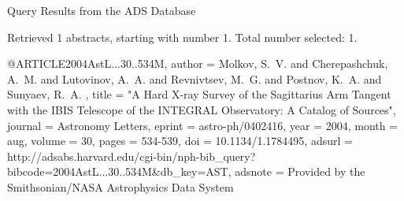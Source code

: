 Query Results from the ADS Database


Retrieved 1 abstracts, starting with number 1.  Total number selected: 1.

@ARTICLE{2004AstL...30..534M,
   author = {{Molkov}, S.~V. and {Cherepashchuk}, A.~M. and {Lutovinov}, A.~A. and 
	{Revnivtsev}, M.~G. and {Postnov}, K.~A. and {Sunyaev}, R.~A.
	},
    title = "{A Hard X-ray Survey of the Sagittarius Arm Tangent with the IBIS Telescope of the INTEGRAL Observatory: A Catalog of Sources}",
  journal = {Astronomy Letters},
   eprint = {astro-ph/0402416},
     year = 2004,
    month = aug,
   volume = 30,
    pages = {534-539},
      doi = {10.1134/1.1784495},
   adsurl = {http://adsabs.harvard.edu/cgi-bin/nph-bib_query?bibcode=2004AstL...30..534M&db_key=AST},
  adsnote = {Provided by the Smithsonian/NASA Astrophysics Data System}
}


